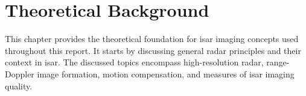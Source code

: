 \documentclass[class=report,11pt,crop=false]{standalone}
\begin{document}
\ifstandalone
\tableofcontents
\fi
\chapter{Theoretical Background \label{ch:theory}} 

This chapter provides the theoretical foundation for \gls{isar} imaging concepts used throughout this report. It starts by discussing general radar principles and their context in \gls{isar}. The discussed topics encompass high-resolution radar, range-Doppler image formation, motion compensation, and measures of \gls{isar} imaging quality.



\end{document}

